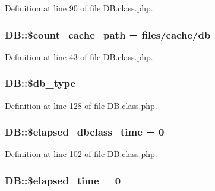 Definition at line 90 of file D\+B.\+class.\+php.

\hypertarget{classDB_aca72b9b3a39bb5e5d2e444f20db2c6bb}{}
\subsubsection[{\$count\+\_\+cache\+\_\+path}]{\setlength{\rightskip}{0pt plus 5cm}D\+B\+::\$count\+\_\+cache\+\_\+path = \textquotesingle{}files/cache/db\textquotesingle{}}\label{classDB_aca72b9b3a39bb5e5d2e444f20db2c6bb}


Definition at line 43 of file D\+B.\+class.\+php.

\hypertarget{classDB_a78868b4c2301aa813d9e2d481424f1e8}{}
\subsubsection[{\$db\+\_\+type}]{\setlength{\rightskip}{0pt plus 5cm}D\+B\+::\$db\+\_\+type}\label{classDB_a78868b4c2301aa813d9e2d481424f1e8}


Definition at line 128 of file D\+B.\+class.\+php.

\hypertarget{classDB_a0483c1bfe18fa5e8bbe7915f9c8187a7}{}
\subsubsection[{\$elapsed\+\_\+dbclass\+\_\+time}]{\setlength{\rightskip}{0pt plus 5cm}D\+B\+::\$elapsed\+\_\+dbclass\+\_\+time = 0}\label{classDB_a0483c1bfe18fa5e8bbe7915f9c8187a7}


Definition at line 102 of file D\+B.\+class.\+php.

\hypertarget{classDB_af5a3fdd4e0078a185dac8c2727fb4f2c}{}
\subsubsection[{\$elapsed\+\_\+time}]{\setlength{\rightskip}{0pt plus 5cm}D\+B\+::\$elapsed\+\_\+time = 0}\label{classDB_af5a3fdd4e0078a185dac8c2727fb4f2c}


